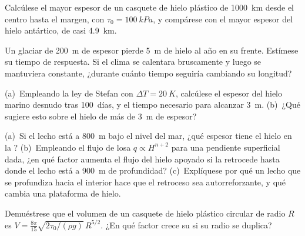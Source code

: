 \begin{exercise}[$\star\star$]\label{exo:b3:glaciology:7}
Calcúlese el mayor espesor de un casquete de hielo plástico de \qty{1000}{km} desde
el centro hasta el margen, con $\tau_0 = \qty{100}{kPa}$, y compárese con el
mayor espesor del hielo antártico, de casi \qty{4.9}{km}.
\end{exercise}

\begin{exercise}[$\star\star$]\label{exo:b3:glaciology:8}
Un glaciar de \qty{200}{m} de espesor pierde \qty{5}{m} de hielo al año en su frente.
Estímese su tiempo de respuesta. Si el clima se calentara bruscamente y luego se mantuviera
constante, ¿durante cuánto tiempo seguiría cambiando su longitud?
\end{exercise}

\begin{exercise}[$\star\star$]\label{exo:b3:glaciology:9}
(a)~Empleando la ley de Stefan con $\Delta T = \qty{20}{K}$, calcúlese el espesor
del hielo marino desnudo tras \num{100}~días, y el tiempo necesario para alcanzar \qty{3}{m}.
(b)~¿Qué sugiere esto sobre el hielo de más de \qty{3}{m} de espesor?
\end{exercise}

\begin{exercise}[$\star\star\star$]\label{exo:b3:glaciology:10}
(a)~Si el lecho está a \qty{800}{m} bajo el nivel del mar, ¿qué espesor tiene el hielo en
la ? (b)~Empleando el flujo de losa $q \propto H^{n+2}$ para una
pendiente superficial dada, ¿en qué factor aumenta el flujo del hielo apoyado si la
 retrocede hasta donde el lecho está a \qty{900}{m} de profundidad? (c)~Explíquese
por qué un lecho que se profundiza hacia el interior hace que el retroceso sea autorreforzante, y qué
cambia una plataforma de hielo.
\end{exercise}

\begin{exercise}[$\star\star\star$]\label{exo:b3:glaciology:11}
Demuéstrese que el volumen de un casquete de hielo plástico circular de radio $R$ es $V =
\frac{8\pi}{15}\sqrt{2\tau_0/(\rho g)}\,R^{5/2}$. ¿En qué factor crece su
 si su radio se duplica?
\end{exercise}

